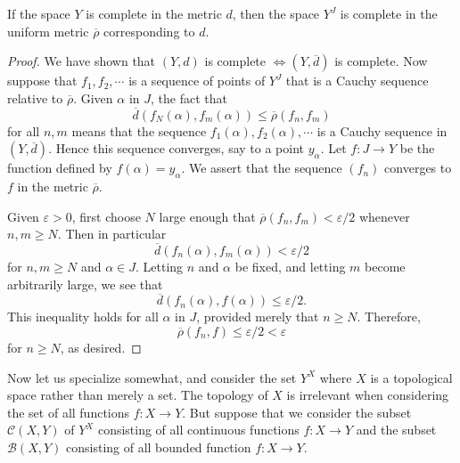 \begin{theorem}
  If the space \( Y \) is complete in the metric \( d \), then the space \( Y^J \) is complete in the uniform metric \( \overline{\rho} \) corresponding to \( d \).
\end{theorem}
\begin{proof}
  We have shown that \( (Y, d) \) is complete \( \iff (Y, \overline{d}) \) is complete.
  Now suppose that \( f_1, f_2, \cdots \) is a sequence of points of \( Y^J \) that is a Cauchy sequence relative to \( \overline{\rho} \).
  Given \( \alpha \) in \( J \), the fact that
  \[
    \overline{d}(f_N(\alpha), f_m(\alpha)) \leq \overline{\rho}(f_n, f_m)
  \]
  for all \( n, m \) means that the sequence \( f_1(\alpha), f_2(\alpha), \cdots \) is a Cauchy sequence in \( (Y, \overline{d}) \).
  Hence this sequence converges, say to a point \( y_\alpha \).
  Let \( f: J \to Y \) be the function defined by \( f(\alpha) = y_\alpha \).
  We assert that the sequence \( (f_n) \) converges to \( f \) in the metric \( \overline{\rho} \).

  Given \( \varepsilon > 0 \), first choose \( N \) large enough that \( \overline{\rho}(f_n, f_m) < \varepsilon / 2 \) whenever \( n, m \geq N \).
  Then in particular
  \[
    \overline{d}(f_n(\alpha), f_m(\alpha)) < \varepsilon / 2
  \]
  for \( n, m \geq N \) and \( \alpha \in J \).
  Letting \( n \) and \( \alpha \) be fixed, and letting \( m \) become arbitrarily large, we see that
  \[
    \overline{d}(f_n(\alpha), f(\alpha)) \leq \varepsilon / 2.
  \]
  This inequality holds for all \( \alpha \) in \( J \), provided merely that \( n \geq N \).
  Therefore,
  \[
    \overline{\rho}(f_n, f) \leq \varepsilon / 2 < \varepsilon
  \]
  for \( n \geq N \), as desired.
\end{proof}

Now let us specialize somewhat, and consider the set \( Y^X \) where \( X \) is a topological space rather than merely a set.
The topology of \( X \) is irrelevant when considering the set of all functions \( f: X \to Y \).
But suppose that we consider the subset \( \mathcal{C}(X, Y) \) of \( Y^X \) consisting of all continuous functions \( f: X \to Y \) and the subset \( \mathcal{B}(X, Y) \) consisting of all bounded function \( f: X \to Y \).


